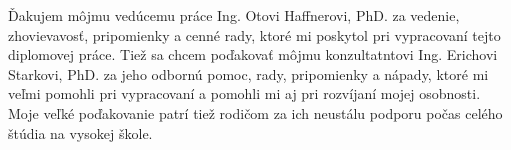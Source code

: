 Ďakujem môjmu vedúcemu práce Ing. Otovi Haffnerovi, PhD. za vedenie, zhovievavosť, pripomienky a cenné rady, ktoré mi poskytol pri vypracovaní tejto diplomovej práce. Tiež sa chcem poďakovať môjmu konzultatntovi Ing. Erichovi Starkovi, PhD. za jeho odbornú pomoc, rady, pripomienky a nápady, ktoré mi veľmi pomohli pri vypracovaní a pomohli mi aj pri rozvíjaní mojej osobnosti. Moje veľké poďakovanie patrí tiež rodičom za ich neustálu podporu počas celého štúdia na vysokej škole.